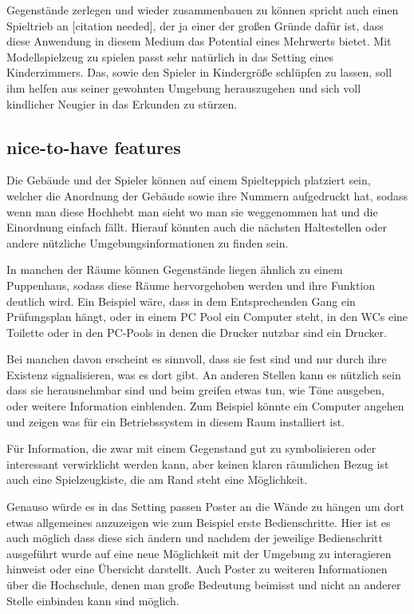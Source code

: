 \documentclass[11pt]{article} %
\begin{document}
Gegenstände zerlegen und wieder zusammenbauen zu können spricht auch einen Spieltrieb an [citation needed], der ja einer der großen Gründe dafür ist, dass diese Anwendung in diesem Medium das Potential eines Mehrwerts bietet.
Mit Modellspielzeug zu spielen passt sehr natürlich in das Setting eines Kinderzimmers. Das, sowie den Spieler in Kindergröße schlüpfen zu lassen, soll ihm helfen aus seiner gewohnten Umgebung herauszugehen und sich voll kindlicher Neugier in das Erkunden zu stürzen.

\subsection{nice-to-have features}

Die Gebäude und der Spieler können auf einem Spielteppich platziert sein, welcher die Anordnung der Gebäude sowie ihre Nummern aufgedruckt hat, sodass wenn man diese Hochhebt man sieht wo man sie weggenommen hat und die Einordnung einfach fällt. Hierauf könnten auch die nächsten Haltestellen oder andere nützliche Umgebungsinformationen zu finden sein. 

In manchen der Räume können Gegenstände liegen ähnlich zu einem Puppenhaus, sodass diese Räume hervorgehoben werden und ihre Funktion deutlich wird. Ein Beispiel wäre, dass in dem Entsprechenden Gang ein Prüfungsplan hängt, oder in einem PC Pool ein Computer steht, in den WCs eine Toilette oder in den PC-Pools in denen die Drucker nutzbar sind ein Drucker.

Bei manchen davon erscheint es sinnvoll, dass sie fest sind und nur durch ihre Existenz signalisieren, was es dort gibt. An anderen Stellen kann es nützlich sein dass sie herausnehmbar sind und beim greifen etwas tun, wie Töne ausgeben, oder weitere Information einblenden. Zum Beispiel könnte ein Computer angehen und zeigen was für ein Betriebssystem in diesem Raum installiert ist.

Für Information, die zwar mit einem Gegenstand gut zu symbolisieren oder interessant verwirklicht werden kann, aber keinen klaren räumlichen Bezug ist auch eine Spielzeugkiste, die am Rand steht eine Möglichkeit. 

Genauso würde es in das Setting passen Poster an die Wände zu hängen um dort etwas allgemeines anzuzeigen wie zum Beispiel erste Bedienschritte. Hier ist es auch möglich dass diese sich ändern und nachdem der jeweilige Bedienschritt ausgeführt wurde auf eine neue Möglichkeit mit der Umgebung zu interagieren hinweist oder eine Übersicht darstellt. Auch Poster zu weiteren Informationen über die Hochschule, denen man große Bedeutung beimisst und nicht an anderer Stelle einbinden kann sind möglich.
\end{document}
